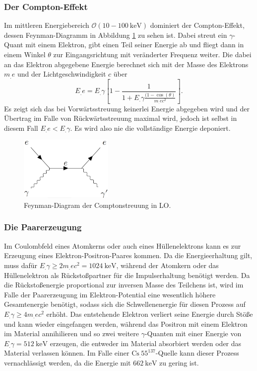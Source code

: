 \subsubsection{Der Compton-Effekt}

Im mittleren Energiebereich $\mathcal{O}(10 - \SI{100}{\kilo\eV})$ dominiert der Compton-Effekt, dessen Feynman-Diagramm in Abbildung \ref{fig:compton} zu sehen ist.
Dabei streut ein $\gamma$-Quant mit einem Elektron, gibt einen Teil seiner Energie ab und fliegt dann in einem Winkel $\theta$ zur Eingangsrichtung mit veränderter Frequenz weiter.
Die dabei an das Elektron abgegebene Energie berechnet sich mit der Masse des Elektrons $m_.e$ und der Lichtgeschwindigkeit $c$ über
\[
E_.e = E_.{\gamma}\left[1-\frac{1}{1+E_.{\gamma}\frac{(1-\cos(\theta)}{m_.ec^2}}\right]\text{.}
\]
Es zeigt sich das bei Vorwärtsstreuung keinerlei Energie abgegeben wird und der Übertrag im Falle von Rückwärtsstreuung maximal wird, jedoch ist selbst in diesem Fall $E_.e < E_.{\gamma}$. Es wird also nie die vollständige Energie deponiert.

\begin{figure}
\centering
\includegraphics[keepaspectratio, width=0.4\textwidth]{content/images/compton.png}
\caption{Feynman-Diagram der Comptonstreuung in LO.}
\label{fig:compton}
\end{figure}

\subsubsection{Die Paarerzeugung}

Im Coulombfeld eines Atomkerns oder auch eines Hüllenelektrons kann es zur Erzeugung eines Elektron-Positron-Paares kommen. Da die Energieerhaltung gilt, muss dafür $E_.{\gamma} \geq 2m_.ec^2 = \SI{1024}{\kilo\eV}$, während der Atomkern oder das Hüllenelektron als Rückstoßpartner für die Impulserhaltung benötigt werden. Da die Rückstoßenergie proportional zur inversen Masse des Teilchens ist, wird im Falle der Paarerzeugung im Elektron-Potential eine wesentlich höhere Gesamtenergie benötigt, sodass sich die Schwellenenergie für diesen Prozess auf $E_.{\gamma} \geq 4m_.ec^2$ erhöht. Das entstehende Elektron verliert seine Energie durch Stöße und kann wieder eingefangen werden, während das Positron mit einem Elektron im Material annihilieren und so zwei weitere $\gamma$-Quanten mit einer Energie von $E_.{\gamma}=\SI{512}{\kilo\eV}$ erzeugen, die entweder im Material absorbiert werden oder das Material verlassen können. 
Im Falle einer $\text{Cs}_.{55}^\text{137}$-Quelle kann dieser Prozess vernachlässigt werden, da die Energie mit $\SI{662}{\kilo\eV}$ zu gering ist.


